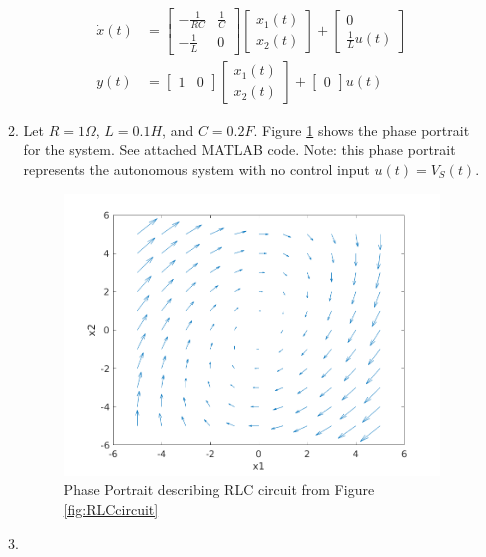 \documentclass[11pt]{article}
\theoremstyle{definition}
\begin{document}
\begin{enumerate}
\begin{enumerate}
        \begin{align}
            \dot{x}(t) &=  \begin{bmatrix} -\frac{1}{RC} & \frac{1}{C} \\ -\frac{1}{L} & 0 \end{bmatrix} \begin{bmatrix} x_1(t) \\ x_2(t) \end{bmatrix} + \begin{bmatrix} 0 \\ \frac{1}{L} u(t) \end{bmatrix} \\
            y(t) &= \begin{bmatrix} 1 & 0 \end{bmatrix} \begin{bmatrix} x_1(t) \\ x_2(t) \end{bmatrix} + \begin{bmatrix} 0 \end{bmatrix} u(t)
        \end{align}


    	\item %
    	Let $R = 1\Omega$, $L = 0.1H$, and $C = 0.2F$.  Figure \ref{fig:phaseportrait} shows the phase portrait for the system.  See attached MATLAB code.  Note: this phase portrait represents the autonomous system with no control input $u(t) = V_S(t)$.

    	\begin{figure}[h]
    		\centering
    		\includegraphics[width = 0.6 \textwidth]{ES155P2_1b_phaseportrait.png}
    		\caption{Phase Portrait describing RLC circuit from Figure \ref{fig:RLCcircuit}}
    		\label{fig:phaseportrait}
    	\end{figure}

    	\item %


\end{enumerate}
\end{enumerate}
\end{document}
